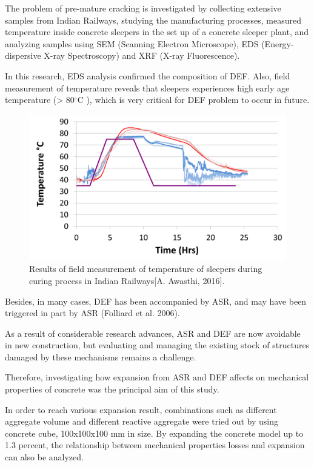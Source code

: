 The problem of pre-mature cracking is investigated by collecting extensive samples from Indian Railways, studying the manufacturing processes, measured temperature inside concrete sleepers in the set up of a concrete sleeper plant, and analyzing samples using SEM (Scanning Electron Microscope), EDS (Energy-dispersive X-ray Spectroscopy) and XRF (X-ray Fluorescence).

In this research, EDS analysis confirmed the composition of DEF. Also, field measurement of temperature reveals that sleepers experiences high early age temperature (> 80$^\circ$C ), which is very critical for DEF problem to occur in future.

    \begin{figure}[ht!]
        \centering
        \includegraphics[width=.8\linewidth]{Files/Background/Anupam_2.png}
        \caption{Results of field measurement of temperature
 of sleepers during curing process in Indian Railways[A. Awasthi, 2016].}
        \label{fig:Awasthi_2}
    \end{figure}

Besides, in many cases, DEF has been accompanied by ASR, and may have been triggered in part by ASR (Folliard et al. 2006)\cite{Folliard}.

As a result of considerable research advances, ASR and DEF are now avoidable in new construction, but evaluating and managing the existing stock of structures damaged by these mechanisms remains a challenge.

Therefore, investigating how expansion from ASR and DEF affects on mechanical properties of concrete was the principal aim of this study.

In order to reach various expansion result, combinations such as different aggregate volume and different reactive aggregate were tried out by using concrete cube, 100x100x100 mm in size. By expanding the concrete model up to 1.3 percent, the relationship between mechanical properties losses and expansion can also be analyzed.

